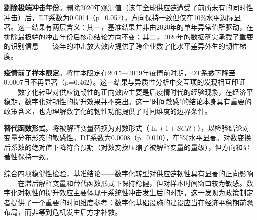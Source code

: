 \textbf{剔除极端冲击年份}。删除2020年观测值（该年全球供应链遭受了前所未有的同时性冲击）后，DT系数为0.0014（p=0.057），方向保持一致但仅在10\%水平边际显著。这一结果有两层含义：其一，基准结果并非由2020年的单年异常值所驱动，在排除最极端的冲击年份后核心结论方向不变；其二，2020年的数据确实承载了重要的识别信息——该年的冲击放大效应提供了跨企业数字化水平差异外生的韧性梯度。

\textbf{疫情前子样本限定}。将样本限定在2015—2019年疫情前时期，DT系数下降至0.0007且不再显著（p=0.462）。这一结果与异质性分析中交互项的发现相互印证——数字化转型对供应链韧性的正向效应主要是后疫情时代的经验现象，在经济平稳期，数字化对韧性的提升效果并不突出。这一"时间敏感"的结论本身具有重要的政策含义，也为理解数字化的韧性功能提供了时间维度的边界条件。

\textbf{替代函数形式}。将被解释变量替换为对数形式（$\ln(1+SCR)$），以检验结论对变量分布形态的敏感性。DT系数为0.0008（p=0.010），在5\%水平显著。对数变换后系数的绝对值下降符合预期（对数变换压缩了被解释变量的量级），但方向和显著性保持一致。

综合四项稳健性检验，基准结论——数字化转型对供应链韧性具有显著的正向影响——在滞后解释变量和替代函数形式下保持稳健，但对样本时间窗口较为敏感。数字化对韧性的提升效应主要体现于系统性冲击发生后的时期，这一发现为政策制定者提供了一个重要的时间维度参考：数字化基础设施的建设应当在经济平稳期前瞻布局，而非等到危机发生后方才补救。


\FloatBarrier
